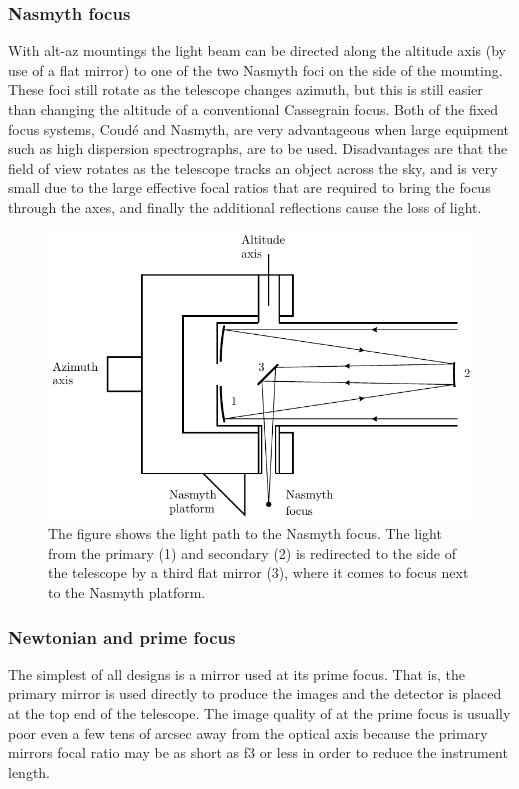 \subsubsection{Nasmyth focus}
With alt-az mountings the light beam can be directed
along the altitude axis (by use of a flat mirror) to one of the two Nasmyth foci on the side of the mounting.
These foci still rotate as the telescope changes azimuth, but this is still easier than 
changing the altitude of a conventional Cassegrain focus. Both of the
fixed focus systems, Coud\'e and Nasmyth, are very advantageous when large equipment
such as high dispersion spectrographs, are to be used. Disadvantages are that the
field of view rotates as the telescope tracks an object across the sky, and is very 
small due to the large effective focal ratios that are required to bring the focus 
through the axes, and finally the additional reflections cause the loss of light.
%
\begin{figure}[htpb]
	\centering
	\includegraphics[scale=1.0]{nasmyth_focus_side.pdf}
	\caption{The figure shows the light path to the Nasmyth focus. The light from the
	primary (1) and secondary (2) is redirected to the side of the telescope by a third
	flat mirror (3), where it comes to focus next to the Nasmyth platform.}
	\label{fig:nasmyth_focus_side}
\end{figure}

\subsubsection{Newtonian and prime focus}
The simplest of all designs is a mirror used at its prime focus. That is, 
the primary mirror is used directly to produce the images and the detector
is placed at the top end of the telescope. The image quality of at the prime
focus is usually poor even a few tens of arcsec away from the optical axis
because the primary mirrors focal ratio may be as short as f3 or less in %
order to reduce the instrument length.

